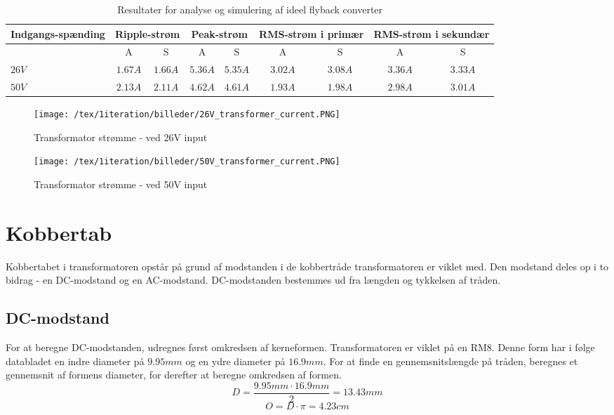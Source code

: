 \begin{table}[H] 			
	\centering
	\begin{tabularx}{\textwidth}{|X|c|c|c|c|c|c|c|c|}
		\hline
		\textbf{Indgangs-spænding} & \multicolumn{2}{|X|}{\textbf{Ripple-strøm}} & \multicolumn{2}{|X|}{\textbf{Peak-strøm}} & \multicolumn{2}{|X|}{\textbf{RMS-strøm i primær}} & \multicolumn{2}{|X|}{\textbf{RMS-strøm i sekundær}} \\ \hline
		& A & S & A & S & A & S & A & S \\ \hline
		$26V$ & $1.67A$ & $1.66A$ & $5.36A$ & $5.35A$ & $3.02A$ & $3.08A$ & $3.36A$ & $3.33A$ \\ \hline 
		$50V$ & $2.13A$ & $2.11A$ & $4.62A$ & $4.61A$ & $1.93A$ & $1.98A$ & $2.98A$ & $3.01A$ \\ \hline
	\end{tabularx}
	\caption{Resultater for analyse og simulering af ideel flyback converter}
	\label{tab:result_ideal_converter}
\end{table}

\begin{figure}[H]
	\center
	\texttt{[image: /tex/1iteration/billeder/26V\_transformer\_current.PNG]}
	\caption{Transformator strømme - ved 26V input}
	\label{fig:26V_transformer_current}
\end{figure}

\begin{figure}[H]
	\center
	\texttt{[image: /tex/1iteration/billeder/50V\_transformer\_current.PNG]}
	\caption{Transformator strømme - ved 50V input}
	\label{fig:50V_transformer_current}
\end{figure}

\section{Kobbertab}
Kobbertabet i transformatoren opstår på grund af modstanden i de kobbertråde transformatoren er viklet med. Den modstand deles op i to bidrag - en DC-modstand og en AC-modstand. DC-modstanden bestemmes ud fra længden og tykkelsen af tråden. 

\subsection{DC-modstand}
For at beregne DC-modstanden, udregnes først omkredsen af kerneformen. Transformatoren er viklet på en RM8. Denne form har i følge databladet en indre diameter på $9.95mm$ og en ydre diameter på $16.9mm$. For at finde en gennemsnitslængde på tråden, beregnes et gennemsnit af formens diameter, for derefter at beregne omkredsen af formen.
\begin{equation} \label{Diameter}
D = \frac{9.95mm \cdot 16.9mm}{2} = 13.43mm
\end{equation}
\begin{equation} \label{Omkreds}
O = D \cdot \pi = 4.23cm
\end{equation}

